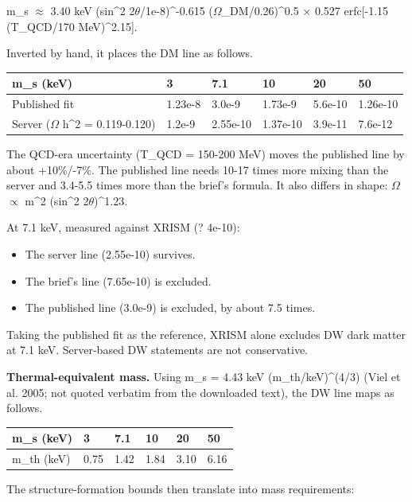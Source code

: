 \documentclass[11pt,a4paper]{article}
\begin{document}
m\_s $\approx$ 3.40 keV (sin\textasciicircum{}2 2$\theta$/1e-8)\textasciicircum{}-0.615 ($\Omega$\_DM/0.26)\textasciicircum{}0.5 $\times$ 0.527 erfc[-1.15 (T\_QCD/170 MeV)\textasciicircum{}2.15].

Inverted by hand, it places the DM line as follows.

\begin{longtable}{@{}p{}p{}p{}p{}p{}p{}@{}}
\toprule
\textbf{m\_s (keV)} & \textbf{3} & \textbf{7.1} & \textbf{10} & \textbf{20} & \textbf{50} \\ \midrule \endhead
Published fit & 1.23e-8 & 3.0e-9 & 1.73e-9 & 5.6e-10 & 1.26e-10 \\
Server ($\Omega$ h\textasciicircum{}2 = 0.119-0.120) & 1.2e-9 & 2.55e-10 & 1.37e-10 & 3.9e-11 & 7.6e-12 \\
\bottomrule\end{longtable}
The QCD-era uncertainty (T\_QCD = 150-200 MeV) moves the published line by about +10\%/-7\%. The published line needs 10-17 times more mixing than the server and 3.4-5.5 times more than the brief's formula. It also differs in shape: $\Omega$ $\propto$ m\textasciicircum{}2 (sin\textasciicircum{}2 2$\theta$)\textasciicircum{}1.23.

At 7.1 keV, measured against XRISM (? 4e-10):

\begin{itemize}
  \item The server line (2.55e-10) survives.
  \item The brief's line (7.65e-10) is excluded.
  \item The published line (3.0e-9) is excluded, by about 7.5 times.
\end{itemize}
Taking the published fit as the reference, XRISM alone excludes DW dark matter at 7.1 keV. Server-based DW statements are not conservative.

\textbf{Thermal-equivalent mass.} Using m\_s = 4.43 keV (m\_th/keV)\textasciicircum{}(4/3) (Viel et al. 2005; not quoted verbatim from the downloaded text), the DW line maps as follows.

\begin{longtable}{@{}p{}p{}p{}p{}p{}p{}@{}}
\toprule
\textbf{m\_s (keV)} & \textbf{3} & \textbf{7.1} & \textbf{10} & \textbf{20} & \textbf{50} \\ \midrule \endhead
m\_th (keV) & 0.75 & 1.42 & 1.84 & 3.10 & 6.16 \\
\bottomrule\end{longtable}
The structure-formation bounds then translate into mass requirements:
\end{document}
